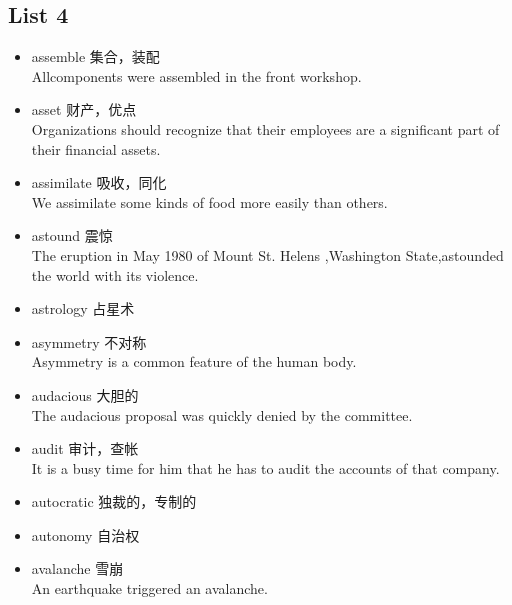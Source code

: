 \documentclass[a4paper,10pt]{article}
\begin{document}
\begin{CJK*}{UTF8}{gkai}
\newpage
\section{List 4}
\begin{itemize}
\item assemble 集合，装配\\ 
\hspace{1cm}Allcomponents were assembled in the front workshop.
\item asset 财产，优点\\
\hspace{1cm}Organizations should recognize that their employees are a significant part of their financial assets.
\item assimilate 吸收，同化\\
\hspace{1cm}We assimilate some kinds of food more easily than others.
\item astound 震惊\\
\hspace{1cm}The eruption in May 1980 of Mount St. Helens ,Washington State,astounded the world with its violence.
\item astrology  占星术\\
\hspace{1cm}
\item asymmetry 不对称\\
\hspace{1cm}Asymmetry is a common feature of the human body.
\item audacious 大胆的\\
\hspace{1cm}The audacious proposal was quickly denied by the committee.
\item audit 审计，查帐\\
\hspace{1cm}It is a busy time for him that he has to audit the accounts of that company.
\item autocratic 独裁的，专制的\\
\hspace{1cm}
\item autonomy 自治权\\
\hspace{1cm}
\item avalanche 雪崩\\
\hspace{1cm}An earthquake triggered an avalanche.
\end{itemize}


\end{CJK*}
\end{document}
